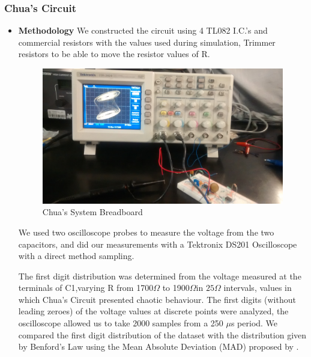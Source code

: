 \subsubsection{Chua's Circuit}
 \begin{itemize}
  \item \textbf{Methodology}
We constructed the circuit using 4 TL082 I.C.'s and commercial resistors with the values used during simulation, Trimmer resistors to be able to move the resistor values of R.

            \begin{figure}[h]
            \centering
            \includegraphics[scale=0.1]{imagenes/2-benford/chua_breadboard.jpg}
            \caption{Chua's System Breadboard}
            \end{figure}
We used two oscilloscope probes to measure the voltage from the two capacitors, and did our measurements with  a Tektronix DS201 Oscilloscope with a direct method sampling.

 The first digit distribution was determined from the voltage measured at the terminals of C1,varying R from 1700$\Omega$ to 1900$\Omega$in $25\Omega$ intervals, values in which Chua's Circuit presented chaotic behaviour. The first digits (without leading zeroes) of the voltage values at discrete points were analyzed, the oscilloscope allowed us to take 2000 samples from a 250 $\mu$s period. We compared the first digit distribution of the dataset with the distribution given by Benford's Law using the Mean Absolute Deviation (MAD) proposed by \cite{Nigrini97}.




\end{itemize}
